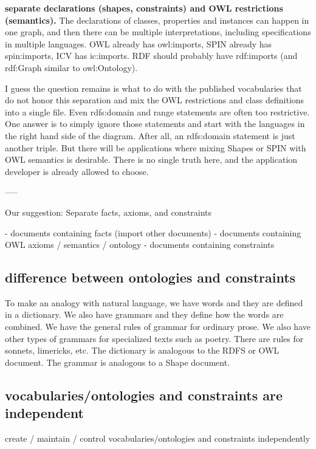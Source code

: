\documentclass{llncs}
\begin{document}
\textbf{separate declarations (shapes, constraints) and OWL restrictions (semantics).}
The declarations of classes, properties and instances can happen in one graph, 
and then there can be 
multiple interpretations, including specifications in multiple 
languages. OWL already has owl:imports, SPIN already has spin:imports, 
ICV has ic:imports. RDF should probably have rdf:imports (and rdf:Graph 
similar to owl:Ontology).

I guess the question remains is what to do with the published 
vocabularies that do not honor this separation and mix the OWL 
restrictions and class definitions into a single file. Even rdfs:domain 
and range statements are often too restrictive. One answer is to simply 
ignore those statements and start with the languages in the right hand 
side of the diagram. After all, an rdfs:domain statement is just another 
triple. But there will be applications where mixing Shapes or SPIN with 
OWL semantics is desirable. There is no single truth here, and the 
application developer is already allowed to choose.


-----

Our suggestion:
Separate facts, axioms, and constraints

- documents containing facts (import other documents)
- documents containing OWL axioms / semantics / ontology
- documents containing constraints

\subsection{difference between ontologies and constraints}

To make an analogy with natural language, we have words and they are 
defined in a dictionary. We also have grammars and they define how the 
words are combined. We have the general rules of grammar for ordinary 
prose. We also have other types of grammars for specialized texts such as 
poetry. There are rules for sonnets, limericks, etc. The dictionary is 
analogous to the RDFS or OWL document. The grammar is analogous to a Shape 
document.

\subsection{vocabularies/ontologies and constraints are independent}

create / maintain / control vocabularies/ontologies and constraints independently
\end{document}
